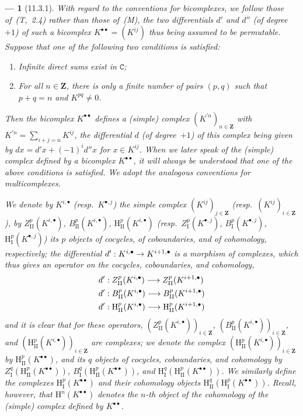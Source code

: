 \documentclass[oneside]{amsart}
\theoremstyle{ega-env-style}
\newtheorem*{env}{---}
\theoremstyle{ega-thm-env-style}
\theoremstyle{ega-defn-env-style}
\def\bb{\mathbf}                    %
\def\cat{\mathtt}                   %
\def\HH{\mathrm{H}}                 %
\renewcommand{\to}{\mathchoice{\longrightarrow}{\rightarrow}{\rightarrow}{\rightarrow}}
\let\EGAOriginalLabel\label
\renewcommand{\label}[1]{\phantomsection\EGAOriginalLabel{#1}}
\begin{document}
\begin{env}[11.3.1]
\label{0.11.3.1}
With regard to the conventions for bicomplexes, we follow those of~(T,~2.4) rather than those of~(M), the two differentials $d'$ and $d''$ (of degree~$+1$) of such a bicomplex $K^{\bullet\bullet}=(K^{ij})$ thus being assumed to be \emph{permutable}.
Suppose that \emph{one} of the following two conditions is satisfied:
\begin{enumerate}
   \item \emph{Infinite direct sums} exist in $\cat{C}$;
   \item For all $n\in\bb{Z}$, there is only a \emph{finite} number of pairs $(p,q)$ such that $p+q=n$ and $K^{pq}\neq 0$.
 \end{enumerate}
Then the bicomplex $K^{\bullet\bullet}$ defines a (simple) \emph{complex} $(K^{\prime n})_{n\in\bb{Z}}$ with $K^{\prime n}=\sum_{i+j=n}K^{ij}$, the differential $d$ (of degree~$+1$) of this complex being given by $dx=d'x+(-1)^i d''x$ for $x\in K^{ij}$.
When we later speak of the (simple) \emph{complex defined by a bicomplex $K^{\bullet\bullet}$}, it will always be understood that one of the above conditions is satisfied.
We adopt the analogous conventions for multicomplexes.

We denote by $K^{i,\bullet}$ (resp.~$K^{\bullet,j}$) the simple complex $(K^{ij})_{j\in\bb{Z}}$ (resp.~$(K^{ij})_{i\in\bb{Z}}$), by $Z_\mathrm{II}^p(K^{i,\bullet})$, $B_\mathrm{II}^p(K^{i,\bullet})$, $\HH_\mathrm{II}^p(K^{i,\bullet})$ (resp.~$Z_\mathrm{I}^p(K^{\bullet,j})$, $B_\mathrm{I}^p(K^{\bullet,j})$, $\HH_\mathrm{I}^p(K^{\bullet,j})$) its $p$ objects of cocycles, of coboundaries, and of cohomology, respectively;
the differential $d':K^{i,\bullet}\to K^{i+1,\bullet}$ is a morphism of complexes, which thus gives an operator on the cocycles, coboundaries, and cohomology,
\begin{align*}
  d'&:Z_\mathrm{II}^p(K^{i,\bullet})\to Z_\mathrm{II}^p(K^{i+1,\bullet})
\\d'&:B_\mathrm{II}^p(K^{i,\bullet})\to B_\mathrm{II}^p(K^{i+1,\bullet})
\\d'&:\HH_\mathrm{II}^p(K^{i,\bullet})\to\HH_\mathrm{II}^p(K^{i+1,\bullet})
\end{align*}
and it is clear that for these operators, $(Z_\mathrm{II}^p(K^{i,\bullet}))_{i\in\bb{Z}}$, $(B_\mathrm{II}^p(K^{i,\bullet}))_{i\in\bb{Z}}$, and $(\HH_\mathrm{II}^p(K^{i,\bullet}))_{i\in\bb{Z}}$ are complexes;
we denote the complex $(\HH_\mathrm{II}^p(K^{i,\bullet}))_{i\in\bb{Z}}$ by $\HH_\mathrm{II}^p(K^{\bullet\bullet})$, and its $q$ objects of cocycles, coboundaries, and cohomology by $Z_\mathrm{I}^q(\HH_\mathrm{II}^p(K^{\bullet\bullet}))$, $B_\mathrm{I}^q(\HH_\mathrm{II}^p(K^{\bullet\bullet}))$, and $\HH_\mathrm{I}^q(\HH_\mathrm{II}^p(K^{\bullet\bullet}))$.
We similarly define the complexes $\HH_\mathrm{I}^p(K^{\bullet\bullet})$ and their cohomology objects $\HH_\mathrm{II}^q(\HH_\mathrm{I}^p(K^{\bullet\bullet}))$.
Recall, however, that $\HH^n(K^{\bullet\bullet})$ denotes the $n$-th object of the cohomology of the \emph{(simple)} complex defined by $K^{\bullet\bullet}$.
\end{env}
\end{document}
